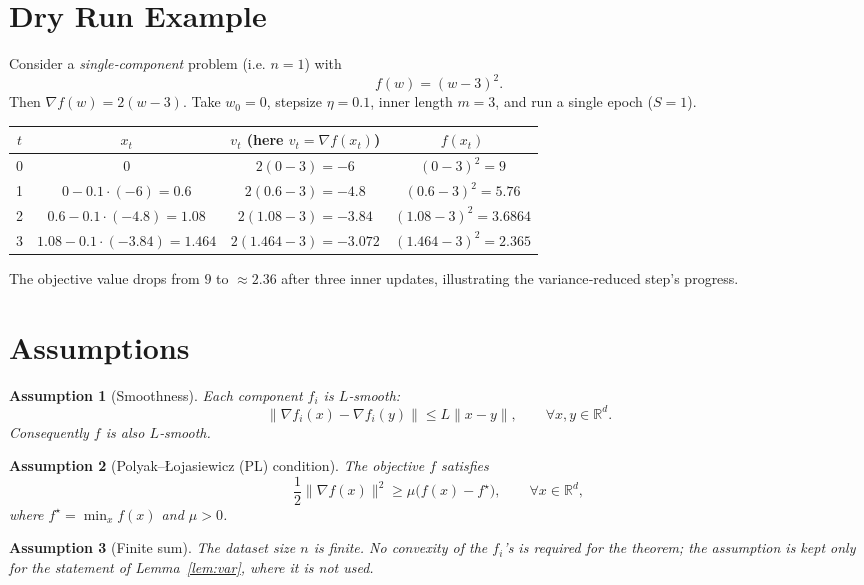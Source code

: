 \documentclass{article}
\newtheorem{assumption}{Assumption}[section]
\begin{document}
\section*{Dry Run Example}
Consider a \emph{single‑component} problem (i.e. $n=1$) with
\[
f(w)=(w-3)^2 .
\]
Then $\nabla f(w)=2(w-3)$.  
Take $w_0=0$, stepsize $\eta=0.1$, inner length $m=3$, and run a single epoch ($S=1$).

\begin{center}
\begin{tabular}{c|c|c|c}
$t$ & $x_t$ & $v_t$ (here $v_t=\nabla f(x_t)$) & $f(x_t)$\\ \hline
0 & $0$ & $2(0-3)=-6$ & $(0-3)^2=9$\\
1 & $0-0.1\cdot(-6)=0.6$ & $2(0.6-3)=-4.8$ & $(0.6-3)^2=5.76$\\
2 & $0.6-0.1\cdot(-4.8)=1.08$ & $2(1.08-3)=-3.84$ & $(1.08-3)^2=3.6864$\\
3 & $1.08-0.1\cdot(-3.84)=1.464$ & $2(1.464-3)=-3.072$ & $(1.464-3)^2=2.365$\\
\end{tabular}
\end{center}
The objective value drops from $9$ to $\approx2.36$ after three inner updates, illustrating the variance‑reduced step’s progress.

\section*{Assumptions}
\begin{assumption}[Smoothness]\label{ass:smooth}
Each component $f_i$ is $L$‑smooth:
\[
\|\nabla f_i(x)-\nabla f_i(y)\|\le L\|x-y\|,\qquad\forall x,y\in\mathbb{R}^d .
\]
Consequently $f$ is also $L$‑smooth.
\end{assumption}

\begin{assumption}[Polyak–\L{}ojasiewicz (PL) condition]\label{ass:pl}
The objective $f$ satisfies
\[
\frac{1}{2}\|\nabla f(x)\|^{2}\ge \mu\bigl(f(x)-f^{\star}\bigr),\qquad\forall x\in\mathbb{R}^d,
\]
where $f^{\star}= \min_{x}f(x)$ and $\mu>0$.
\end{assumption}

\begin{assumption}[Finite sum]\label{ass:finite}
The dataset size $n$ is finite. No convexity of the $f_i$'s is required for the
theorem; the assumption is kept only for the statement of Lemma~\ref{lem:var},
where it is not used.
\end{assumption}
\end{document}
